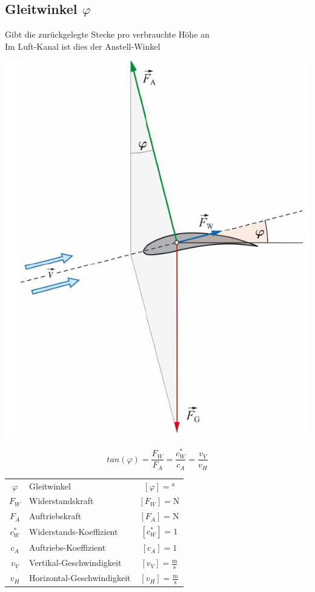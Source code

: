 \subsection{Gleitwinkel $\varphi$}
Gibt die zurückgelegte Stecke pro verbrauchte Höhe an \\
Im Luft-Kanal ist dies der Anstell-Winkel \\

\begin{minipage}{0.5\linewidth}
	\includegraphics[width=\linewidth]{Bilder/gleitwinkel.png}
\end{minipage}
\hfill
\begin{minipage}{0.45\linewidth}
	$$ \boxed{ tan(\varphi) = \frac{F_W}{F_A} = \frac{c^*_W}{c_A}= \frac{v_V}{v_H} }	$$
\end{minipage}






\begin{tabular}{c l c}
		$\varphi$ & Gleitwinkel & $[\varphi] = \text{°}$ \\
		$F_W$ & Widerstandskraft & $[F_W] = \mathrm{N}$ \\
		$F_A$ & Auftriebskraft & $[F_A] = \mathrm{N}$ \\ 
		$c^*_W$ & Widerstands-Koeffizient & $[c^*_W] = 1$ \\
		$c_A$ & Auftriebs-Koeffizient & $[c_A] = 1$ \\
		\rule{0pt}{8pt}$v_V$ & Vertikal-Geschwindigkeit & $[v_V] = \mathrm{\frac{m}{s}}$ \\
		\rule{0pt}{8pt}$v_H$ & Horizontal-Geschwindigkeit & $[v_H] = \mathrm{\frac{m}{s}}$ \\
\end{tabular}


